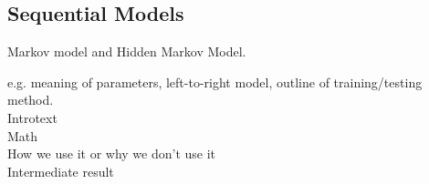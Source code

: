 \subsection{Sequential Models}
Markov model and Hidden Markov Model.

e.g. meaning of parameters, left-to-right model, outline of training/testing method.\\

Introtext\\

Math\\

How we use it or why we don't use it\\

Intermediate result\\

